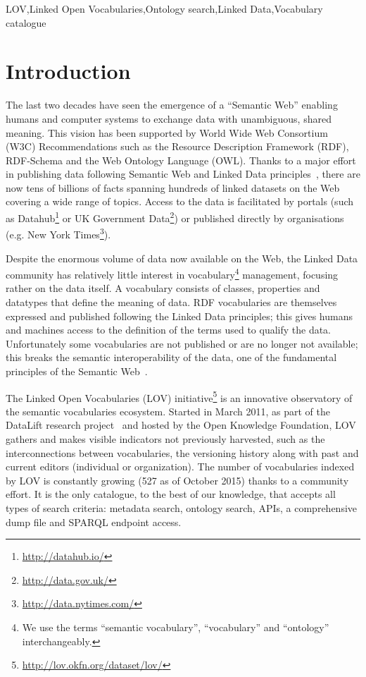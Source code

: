 \documentclass{iosart2c}
\begin{document}
\begin{frontmatter}
\begin{abstract}
\end{abstract}

\begin{keyword}
LOV\sep Linked Open Vocabularies\sep Ontology search\sep Linked Data\sep Vocabulary catalogue
\end{keyword}

\end{frontmatter}


\section{Introduction}
The last two decades have seen the emergence of a ``Semantic Web'' enabling humans and computer systems to exchange data with unambiguous, shared meaning. This vision has been supported by World Wide Web Consortium (W3C) Recommendations such as the Resource Description Framework (RDF), RDF-Schema and the Web Ontology Language (OWL). Thanks to a major effort in publishing data following Semantic Web and Linked Data principles~\cite{timld}, there are now tens of billions of facts spanning hundreds of linked datasets on the Web covering a wide range of topics.%
Access to the data is facilitated by portals (such as Datahub\footnote{\url{http://datahub.io/}} or UK Government Data\footnote{\url{http://data.gov.uk/}}) or published directly by organisations (e.g. New York Times\footnote{\url{http://data.nytimes.com/}}). 

Despite the enormous volume of data now available on the Web, the Linked Data community has relatively little interest in vocabulary\footnote{We use the terms ``semantic vocabulary'', ``vocabulary'' and ``ontology'' interchangeably.} management, focusing rather on the data itself. A vocabulary consists of classes, properties and datatypes that define the meaning of data. RDF vocabularies are themselves expressed and published following the Linked Data principles; this gives humans and machines access to the definition of the terms used to qualify the data. Unfortunately some vocabularies are not published or are no longer not available; this breaks the semantic interoperability of the data, one of the fundamental principles of the Semantic Web~\cite{janowicz2014five}.

The Linked Open Vocabularies (LOV) initiative\footnote{\url{http://lov.okfn.org/dataset/lov/}} is an innovative observatory of the semantic vocabularies ecosystem. Started in March 2011, as part of the DataLift research project~\cite{scharffe_2012} and hosted by the Open Knowledge Foundation, LOV gathers and makes visible  indicators not previously harvested, such as the interconnections between vocabularies, the versioning history along with past and current editors  (individual or organization). The number of vocabularies indexed by LOV is constantly growing (527 as of October 2015) thanks to a community effort. It is the only catalogue, to the best of our knowledge, that accepts all types of search criteria: metadata search, ontology search, APIs, a comprehensive dump file and SPARQL endpoint access. 
\end{document}
